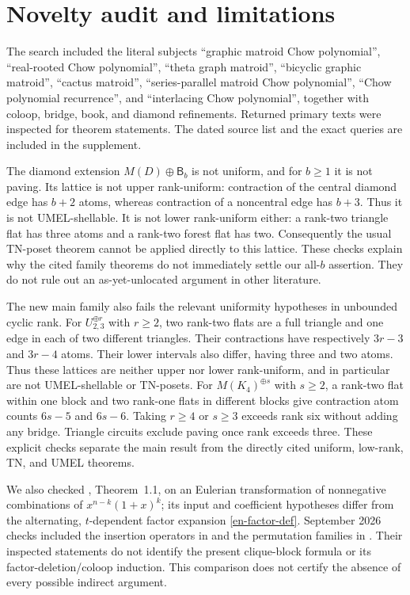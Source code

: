 \documentclass[12pt]{amsart}
\theoremstyle{definition}
\theoremstyle{remark}
\numberwithin{equation}{section}
\newcommand{\Bmat}{\mathsf{B}}
\begin{document}
\section{Novelty audit and limitations}
The search included the literal subjects ``graphic matroid Chow polynomial'', ``real-rooted Chow polynomial'', ``theta graph matroid'', ``bicyclic graphic matroid'', ``cactus matroid'', ``series-parallel matroid Chow polynomial'', ``Chow polynomial recurrence'', and ``interlacing Chow polynomial'', together with coloop, bridge, book, and diamond refinements. Returned primary texts were inspected for theorem statements. The dated source list and the exact queries are included in the supplement.

The diamond extension $M(D)\oplus\Bmat_b$ is not uniform, and for $b\geq1$ it is not paving. Its lattice is not upper rank-uniform: contraction of the central diamond edge has $b+2$ atoms, whereas contraction of a noncentral edge has $b+3$. Thus it is not UMEL-shellable. It is not lower rank-uniform either: a rank-two triangle flat has three atoms and a rank-two forest flat has two. Consequently the usual TN-poset theorem cannot be applied directly to this lattice. These checks explain why the cited family theorems do not immediately settle our all-$b$ assertion. They do not rule out an as-yet-unlocated argument in other literature.


The new main family also fails the relevant uniformity hypotheses in unbounded cyclic rank. For $U_{2,3}^{\oplus r}$ with $r\geq2$, two rank-two flats are a full triangle and one edge in each of two different triangles. Their contractions have respectively $3r-3$ and $3r-4$ atoms. Their lower intervals also differ, having three and two atoms. Thus these lattices are neither upper nor lower rank-uniform, and in particular are not UMEL-shellable or TN-posets. For $M(K_4)^{\oplus s}$ with $s\geq2$, a rank-two flat within one block and two rank-one flats in different blocks give contraction atom counts $6s-5$ and $6s-6$. Taking $r\geq4$ or $s\geq3$ exceeds rank six without adding any bridge. Triangle circuits exclude paving once rank exceeds three. These explicit checks separate the main result from the directly cited uniform, low-rank, TN, and UMEL theorems.

We also checked \cite{Ath25}, Theorem~1.1, on an Eulerian transformation of nonnegative combinations of $x^{n-k}(1+x)^k$; its input and coefficient hypotheses differ from the alternating, $t$-dependent factor expansion \eqref{en-factor-def}. September 2026 checks included the insertion operators in \cite{Ma26} and the permutation families in \cite{AlexE26}. Their inspected statements do not identify the present clique-block formula or its factor-deletion/coloop induction. This comparison does not certify the absence of every possible indirect argument.
\end{document}
